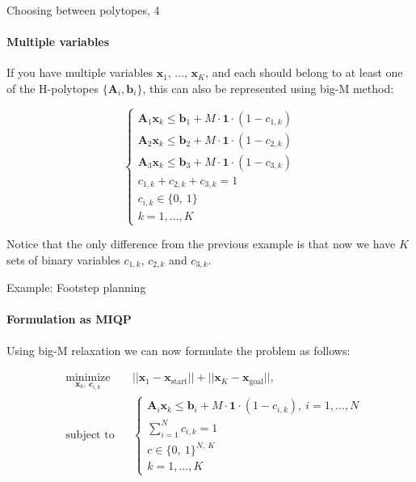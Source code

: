 \documentclass{beamer}
\begin{document}
\begin{frame}{Choosing between polytopes, 4}
\framesubtitle{Multiple variables}
\begin{flushleft}

If you have multiple variables $\mathbf{x}_1$, ..., $\mathbf{x}_K$, and each should belong to at least one of the H-polytopes $\{ \mathbf{A}_i, \mathbf{b}_i\}$, this can also be represented using big-M method:

\begin{equation}
    \begin{cases}
    \mathbf{A}_1 \mathbf{x}_k \leq \mathbf{b}_1 + M \cdot \mathbf{1} \cdot (1 - c_{1, k}) \\
    \mathbf{A}_2 \mathbf{x}_k \leq \mathbf{b}_2 + M \cdot \mathbf{1} \cdot (1 - c_{2, k}) \\
    \mathbf{A}_3 \mathbf{x}_k \leq \mathbf{b}_3 + M \cdot \mathbf{1} \cdot (1 - c_{3, k}) \\
    c_{1, k} + c_{2, k} + c_{3, k} = 1 \\
    c_{i, k}  \in \{0, \ 1 \} \\
    k = 1,...,K
    \end{cases}
\end{equation}

Notice that the only difference from the previous example is that now we have $K$ sets of binary variables $c_{1, k}$,  $c_{2, k}$ and $c_{3, k}$.

\end{flushleft}
\end{frame}






\begin{frame}{Example: Footstep planning}
\framesubtitle{Formulation as MIQP}
\begin{flushleft}

Using big-M relaxation we can now formulate the problem as follows:

\begin{equation}
\begin{aligned}
& \underset{\mathbf{x}_k, \ \mathbf{c}_{i,k}}{\text{minimize}}
& & ||\mathbf{x}_1 - \mathbf{x}_{\text{start}}|| + ||\mathbf{x}_K - \mathbf{x}_{\text{goal}}||, \\
& \text{subject to}
& & \begin{cases}
    \mathbf{A}_i \mathbf{x}_k \leq \mathbf{b}_i + M \cdot \mathbf{1} \cdot (1 - c_{i, k}), \ i = 1,...,N \\
    \sum_{i=1}^N c_{i, k} = 1 \\
    c  \in \{0, \ 1 \}^{N, \ K} \\
    k = 1,...,K
    \end{cases}
\end{aligned}
\end{equation}

 
\end{flushleft}
\end{frame}
\end{document}
